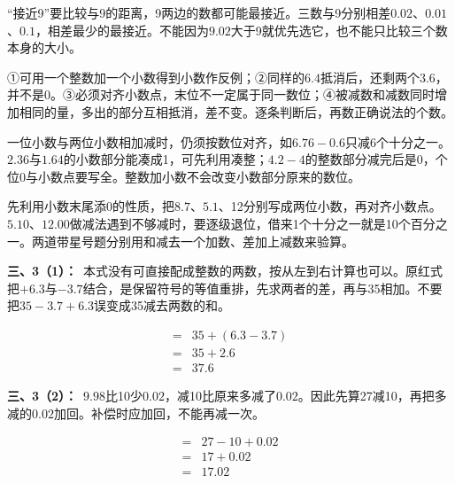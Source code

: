\documentclass[multi=snippet,border=0pt]{standalone}
\newenvironment{snippet}[3]{\begin{minipage}{#1bp}\color{answerred}\fontsize{#2}{#3}\selectfont\raggedright}{\end{minipage}}
\begin{document}
\begin{snippet}{505}{11.5}{14}“接近9”要比较与9的距离，9两边的数都可能最接近。三数与9分别相差\(0.02\)、\(0.01\)、\(0.1\)，相差最少的最接近。不能因为\(9.02\)大于9就优先选它，也不能只比较三个数本身的大小。\end{snippet}
\begin{snippet}{505}{11.5}{14}①可用一个整数加一个小数得到小数作反例；②同样的\(6.4\)抵消后，还剩两个\(3.6\)，并不是0。③必须对齐小数点，末位不一定属于同一数位；④被减数和减数同时增加相同的量，多出的部分互相抵消，差不变。逐条判断后，再数正确说法的个数。\end{snippet}
\begin{snippet}{505}{11.5}{14}一位小数与两位小数相加减时，仍须按数位对齐，如\(6.76-0.6\)只减6个十分之一。\(2.36\)与\(1.64\)的小数部分能凑成1，可先利用凑整；\(4.2-4\)的整数部分减完后是0，个位0与小数点要写全。整数加小数不会改变小数部分原来的数位。\end{snippet}
\begin{snippet}{505}{11.5}{14}先利用小数末尾添0的性质，把\(8.7\)、\(5.1\)、12分别写成两位小数，再对齐小数点。\(5.10\)、\(12.00\)做减法遇到不够减时，要逐级退位，借来1个十分之一就是10个百分之一。两道带星号题分别用和减去一个加数、差加上减数来验算。\end{snippet}
\begin{snippet}{505}{11.5}{14}\textbf{三、3（1）：}\ 本式没有可直接配成整数的两数，按从左到右计算也可以。原红式把\(+6.3\)与\(-3.7\)结合，是保留符号的等值重排，先求两者的差，再与35相加。不要把\(35-3.7+6.3\)误变成35减去两数的和。\end{snippet}
\begin{snippet}{182.0}{10.5}{12.8}\[\begin{aligned}={}&35+(6.3-3.7)\\={}&35+2.6\\={}&37.6\end{aligned}\]\end{snippet}
\begin{snippet}{505}{11.5}{14}\textbf{三、3（2）：}\ \(9.98\)比10少\(0.02\)，减10比原来多减了\(0.02\)。因此先算27减10，再把多减的\(0.02\)加回。补偿时应加回，不能再减一次。\end{snippet}
\begin{snippet}{232.0}{10.5}{12.8}\[\begin{aligned}={}&27-10+0.02\\={}&17+0.02\\={}&17.02\end{aligned}\]\end{snippet}
\end{document}
